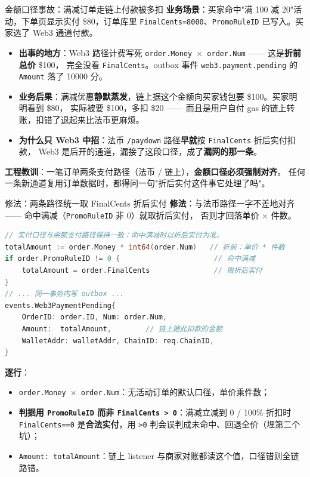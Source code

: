 \documentclass[aspectratio=169,11pt]{beamer}
\begin{document}
\begin{frame}[shrink]{金额口径事故：满减订单走链上付款被多扣}
\textbf{业务场景}：买家命中"满 100 减 20"活动，下单页显示实付 \$80，订单库里
\texttt{FinalCents=8000}、\texttt{PromoRuleID} 已写入。买家选了 Web3 通道付款。
\begin{itemize}
  \item \textbf{出事的地方}：Web3 路径计费写死 \texttt{order.Money $\times$ order.Num} —— 这是\textbf{折前总价} \$100，
  完全没看 \texttt{FinalCents}。outbox 事件 \texttt{web3.payment.pending} 的 \texttt{Amount} 落了 10000 分。
  \item \textbf{业务后果}：满减优惠\textbf{静默蒸发}，链上据这个金额向买家钱包要 \$100。买家明明看到 \$80，
  实际被要 \$100，多扣 \$20 —— 而且是用户自付 gas 的链上转账，扣错了退起来比法币更麻烦。
  \item \textbf{为什么只 Web3 中招}：法币 \texttt{/paydown} 路径\textbf{早就}按 \texttt{FinalCents} 折后实付扣款，
  Web3 是后开的通道，漏接了这段口径，成了\textbf{漏网的那一条}。
\end{itemize}
\vspace{1mm}
\small \textbf{工程教训}：一笔订单两条支付路径（法币 / 链上），\textbf{金额口径必须强制对齐}。
任何一条新通道复用订单数据时，都得问一句"折后实付这件事它处理了吗"。
\end{frame}

\begin{frame}{修法：两条路径统一取 FinalCents 折后实付}
\textbf{修法}：与法币路径一字不差地对齐 —— 命中满减（\texttt{PromoRuleID} 非 0）就取折后实付，
否则才回落单价 $\times$ 件数。
\begin{lstlisting}[language=Go,firstnumber=128,
  caption={}]
// 实付口径与余额支付路径保持一致：命中满减时以折后实付为准。
totalAmount := order.Money * int64(order.Num)   // 折前：单价 * 件数
if order.PromoRuleID != 0 {                      // 命中满减
    totalAmount = order.FinalCents               // 取折后实付
}
// ... 同一事务内写 outbox ...
events.Web3PaymentPending{
    OrderID: order.ID, Num: order.Num,
    Amount:  totalAmount,        // 链上据此扣款的金额
    WalletAddr: walletAddr, ChainID: req.ChainID,
}
\end{lstlisting}
\small \textbf{逐行}：
\begin{itemize}\setlength{\itemsep}{0pt}
  \item \texttt{order.Money $\times$ order.Num}：无活动订单的默认口径，单价乘件数；
  \item \textbf{判据用 \texttt{PromoRuleID} 而非 \texttt{FinalCents > 0}}：满减立减到 0 / 100\% 折扣时
  \texttt{FinalCents==0} 是\textbf{合法实付}，用 \texttt{>0} 判会误判成未命中、回退全价（埋第二个坑）；
  \item \texttt{Amount: totalAmount}：链上 listener 与商家对账都读这个值，口径错则全链路错。
\end{itemize}
\end{frame}
\end{document}

